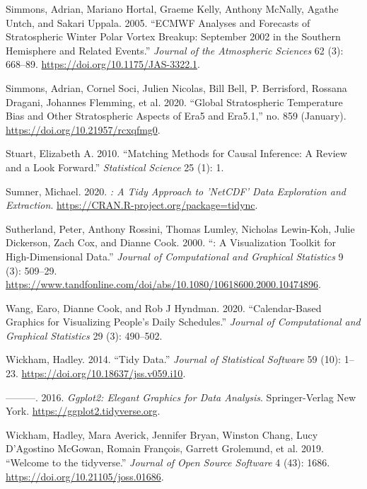 \documentclass{article}
\newlength{\cslhangindent}
\newlength{\cslentryspacingunit} %
\newenvironment{CSLReferences}[2] %
 {%
  \setlength{\parindent}{0pt}
  \ifodd #1
  \let\oldpar\par
  \def\par{\hangindent=\cslhangindent\oldpar}
  \fi
  \setlength{\parskip}{#2\cslentryspacingunit}
 }%
 {}
\begin{document}
\begin{CSLReferences}{1}{0}
\leavevmode{}%
Simmons, Adrian, Mariano Hortal, Graeme Kelly, Anthony McNally, Agathe Untch, and Sakari Uppala. 2005. {``ECMWF Analyses and Forecasts of Stratospheric Winter Polar Vortex Breakup: September 2002 in the Southern Hemisphere and Related Events.''} \emph{Journal of the Atmospheric Sciences} 62 (3): 668--89. \url{https://doi.org/10.1175/JAS-3322.1}.

\leavevmode{}%
Simmons, Adrian, Cornel Soci, Julien Nicolas, Bill Bell, P. Berrisford, Rossana Dragani, Johannes Flemming, et al. 2020. {``Global Stratospheric Temperature Bias and Other Stratospheric Aspects of Era5 and Era5.1,''} no. 859 (January). \url{https://doi.org/10.21957/rcxqfmg0}.

\leavevmode{}%
Stuart, Elizabeth A. 2010. {``Matching Methods for Causal Inference: A Review and a Look Forward.''} \emph{Statistical Science} 25 (1): 1.

\leavevmode{}%
Sumner, Michael. 2020. \emph{: A Tidy Approach to 'NetCDF' Data Exploration and Extraction}. \url{https://CRAN.R-project.org/package=tidync}.

\leavevmode{}%
Sutherland, Peter, Anthony Rossini, Thomas Lumley, Nicholas Lewin-Koh, Julie Dickerson, Zach Cox, and Dianne Cook. 2000. {``: A Visualization Toolkit for High-Dimensional Data.''} \emph{Journal of Computational and Graphical Statistics} 9 (3): 509--29. \url{https://www.tandfonline.com/doi/abs/10.1080/10618600.2000.10474896}.

\leavevmode{}%
Wang, Earo, Dianne Cook, and Rob J Hyndman. 2020. {``Calendar-Based Graphics for Visualizing People's Daily Schedules.''} \emph{Journal of Computational and Graphical Statistics} 29 (3): 490--502.

\leavevmode{}%
Wickham, Hadley. 2014. {``Tidy Data.''} \emph{Journal of Statistical Software} 59 (10): 1--23. \url{https://doi.org/10.18637/jss.v059.i10}.

\leavevmode{}%
---------. 2016. \emph{Ggplot2: Elegant Graphics for Data Analysis}. Springer-Verlag New York. \url{https://ggplot2.tidyverse.org}.

\leavevmode{}%
Wickham, Hadley, Mara Averick, Jennifer Bryan, Winston Chang, Lucy D'Agostino McGowan, Romain François, Garrett Grolemund, et al. 2019. {``Welcome to the {tidyverse}.''} \emph{Journal of Open Source Software} 4 (43): 1686. \url{https://doi.org/10.21105/joss.01686}.


\end{CSLReferences}
\end{document}
